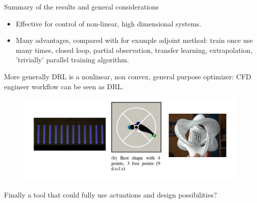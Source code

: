 \documentclass{beamer}
\begin{document}
\begin{frame}{Summary of the results and general considerations}
    \begin{itemize}
      \item Effective for control of non-linear, high dimensional systems.
      \item Many advantages, compared with for example adjoint method: train once use many times, closed loop, partial observation, transfer learning, extrapolation, 'trivially' parallel training algorithm.
    \end{itemize}

    More generally DRL is a nonlinear, non convex, general purpose optimizer: CFD engineer workflow can be seen as DRL.

    \begin{figure}
    \begin{center}
      \includegraphics[width=.70\textwidth]{Figures/fixed_last}
    \end{center}
    \end{figure}

    \begin{center}
        Finally a tool that could fully use actuations and design possibilities?
    \end{center}

\end{frame}
\end{document}
